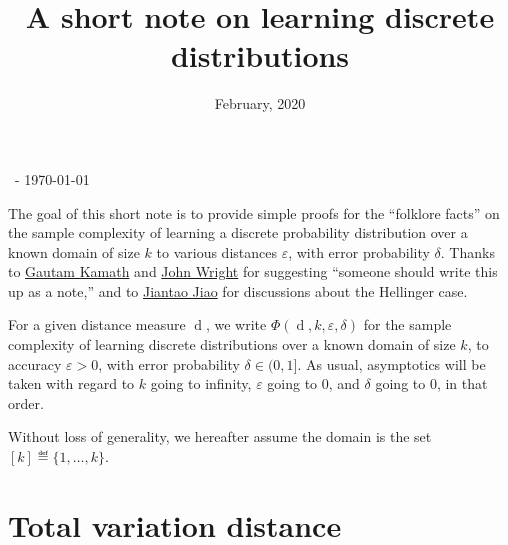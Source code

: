 \documentclass[10pt]{article}
\title{A short note on learning discrete distributions}
\date{February, 2020}
\newcommand{\dst}{\varepsilon}
\newcommand{\ab}{k}
\begin{document}
\begin{flushleft}\sf\footnotesize
\makeatletter
\@date~- \today \hfill \@title
\makeatother
\end{flushleft}
\vspace{5mm}

The goal of this short note is to provide simple proofs for the ``folklore facts'' on the sample complexity of learning a discrete probability distribution over a known domain of size $\ab$ to various distances $\dst$, with error probability $\delta$. Thanks to \href{http://www.gautamkamath.com/}{Gautam Kamath} and \href{http://www.mit.edu/~jswright/}{John Wright} for suggesting ``someone should write this up as a note,'' and to \href{https://people.eecs.berkeley.edu/~jiantao/}{Jiantao Jiao} for discussions about the Hellinger case.\medskip

For a given distance measure $\operatorname{d}$, we write $\Phi(\operatorname{d},\ab,\dst,\delta)$ for the sample complexity of learning discrete distributions over a known domain of size $\ab$, to accuracy $\dst>0$, with error probability $\delta\in(0,1]$. As usual, asymptotics will be taken with regard to $\ab$ going to infinity, $\dst$ going to $0$, and $\delta$ going to $0$, in that order.

\noindent Without loss of generality, we hereafter assume the domain is the set $[\ab]\eqdef \{1,\dots,\ab\}$.

\section{Total variation distance}
\end{document}
